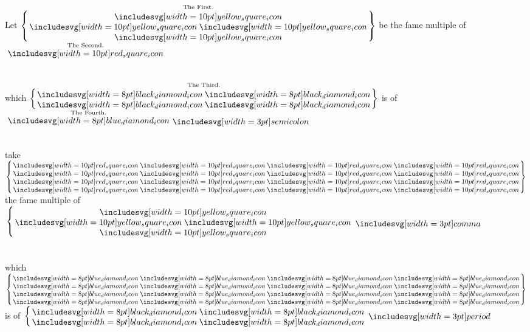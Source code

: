 \documentclass[12pt,preview]{standalone}
\begin{document}
\begin{minipage}{\textwidth}
    \begin{center}
        Let $\overset{\text{\scriptsize The First.}}{\left\{\hspace{-1.5ex}\begin{array}{c} \yellowsquare \\ \yellowsquares \\ \yellowsquare \end{array}\hspace{-1.5ex}\right\}}$ be the ſame multiple of $\overset{\text{\scriptsize The Second.}}{\redsquare}$\\
        \hfill\\
        \hfill\\
        which $\overset{\text{\scriptsize The Third.}}{\left\{\hspace{-1.5ex}\begin{array}{c} \blackdiamonds \\ \blackdiamonds \end{array}\hspace{-1.5ex}\right\}}$ is of $\overset{\text{\scriptsize The Fourth.}}{\bluediamond} \bsemicolon$\\
        \hfill\\
        \hfill\\
        take $\left\{\hspace{-1.5ex}\begin{array}{c} \redsquares \\ \redsquares \\ \redsquares \\ \redsquares \end{array}\hspace{-1.5ex}\right\}$ the ſame multiple of $\left\{\hspace{-1.5ex}\begin{array}{c} \yellowsquare \\ \yellowsquares \\ \yellowsquare \end{array}\hspace{-1.5ex}\right. \bcomma$\\
        \hfill\\
        \hfill\\
        which $\left\{\hspace{-1.5ex}\begin{array}{c} \bluediamonds \\ \bluediamonds \\ \bluediamonds \\ \bluediamonds \end{array}\hspace{-1.5ex}\right\}$ is of $\left\{\hspace{-1.5ex}\begin{array}{c} \blackdiamonds \\ \blackdiamonds \end{array}\hspace{-1.5ex}\right. \bperiod$
    \end{center}
\end{minipage}
\end{document}
